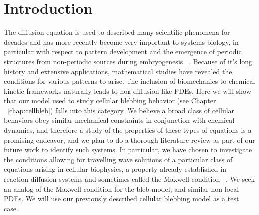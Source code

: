 \section{Introduction}

The diffusion equation is used to described many scientific phenomena for decades and has more recently become very important to systems biology, in particular with respect to pattern development and the emergence of periodic structures from non-periodic sources during embryogenesis ~\cite{Kondo2010}. Because of it's long history and extensive applications, mathematical studies have revealed the conditions for various patterns to arise. The inclusion of biomechanics to chemical kinetic frameworks naturally leads to non-diffusion like PDEs. Here we will show that our model used to study cellular blebbing behavior (see Chapter ~\ref{chap:cellbleb}) falls into this category. We believe a broad class of cellular behaviors obey similar mechanical constraints in conjunction with chemical dynamics, and therefore a study of the properties of these types of equations is a promising endeavor, and we plan to do a thorough literature review as part of our future work to identify such systems. In particular, we have chosen to investigate the conditions allowing for travelling wave solutions of a particular class of equations arising in cellular biophysics, a property already established in reaction-diffusion systems and sometimes called the Maxwell condition ~\cite{Anonymous:OS1MPwCl,Mori:2008hj}. We seek an analog of the Maxwell condition for the bleb model, and similar non-local PDEs. We will use our previously described cellular blebbing model as a test case.\\







